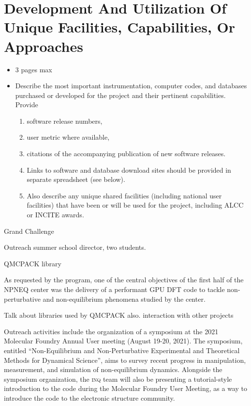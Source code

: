 \section{Development And Utilization Of Unique Facilities, Capabilities, Or Approaches}
\label{sec:development}
{\small\color{red}
\begin{itemize}
\item 3 pages max
    \item Describe the most important instrumentation, computer codes, and databases purchased or developed for the project and their pertinent capabilities. Provide 
    \begin{enumerate}
        \item software release numbers,
        \item user metric where available,
        
        \item citations of the accompanying publication of new software releases.
        \item Links to software and database download sites should be provided in separate spreadsheet (see below).
        \item Also describe any unique shared facilities (including national user facilities) that have been or will be used for the project, including ALCC or INCITE awards.
    \end{enumerate}    
\end{itemize}

}

Grand Challenge 

Outreach summer school director, two students.

QMCPACK library

As requested by the program, one of the central objectives of the first half of the NPNEQ center was the delivery of a performant GPU DFT code to tackle non-perturbative and non-equilibrium phenomena studied by the center.

Talk about libraries used by QMCPACK also. interaction with other projects


Outreach activities include the organization of a symposium at the 2021 Molecular Foundry Annual User meeting (August 19-20, 2021). 
The symposium, entitled ``Non-Equilibrium and Non-Perturbative Experimental and Theoretical Methods for Dynamical Science'', aims to survey recent progress in manipulation, measurement, and simulation of non-equilibrium dynamics.
Alongside the symposium organization, the \textsc{inq} team will also be presenting a tutorial-style introduction to the code during the Molecular Foundry User Meeting, as a way to introduce the code to the electronic structure community.

\clearpage

